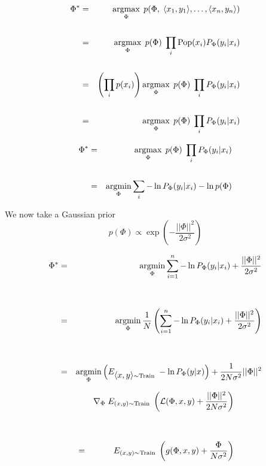 {\vfill
{\huge
\begin{eqnarray*}
\Phi^* & = & \operatorname*{argmax}_\Phi\;p(\Phi,\;{\mbox{$\langle x_1,y_1\rangle$}},\ldots,{\mbox{$\langle x_n,y_n\rangle$}}) \\
\\
 & = & \operatorname*{argmax}_\Phi \; p(\Phi)\;\prod_i \mathrm{Pop}(x_i)P_\Phi(y_i|x_i) \\
 \\
  & = & \left(\prod_i p(x_i)\right) \operatorname*{argmax}_\Phi \; p(\Phi)\;\prod_i  P_\Phi(y_i|x_i) \\
 \\
  & = & \operatorname*{argmax}_\Phi \; p(\Phi)\;\prod_i P_\Phi(y_i|x_i)
 \end{eqnarray*}
}


\begin{eqnarray*}
\Phi^*   & = & \operatorname*{argmax}_\Phi \; p(\Phi)\;\prod_i P_\Phi(y_i|x_i) \\
\\
& = & \operatorname*{argmin}_\Phi \sum_i - \ln P_\Phi(y_i|x_i) -\ln  p(\Phi)
\end{eqnarray*}

\vfill
We now take a Gaussian prior {\color{red} $$p(\Phi) \propto \exp\left(-\frac{||\Phi||^2}{2\sigma^2}\right)$$}


\begin{eqnarray*}
\Phi^* & = & \operatorname*{argmin}_\Phi \sum_{i = 1}^n - \ln P_\Phi(y_i|x_i) + \frac{||\Phi||^2}{2\sigma^2}  \\
\\
\\
& = & \operatorname*{argmin}_\Phi \frac{1}{N} \left(\sum_{i = 1}^n - \ln P_\Phi(y_i|x_i) + \frac{||\Phi||^2}{2\sigma^2}\right)  \\
\\
\\
& = & \operatorname*{argmin}_\Phi \left(E_{{\mbox{$\langle x,y\rangle$}}\sim \mathrm{Train}}\;-\ln P_\Phi(y|x)\right) + \frac{1}{2N\sigma^2} ||\Phi||^2
\end{eqnarray*}


\begin{eqnarray*}
  & & \nabla_\Phi \;E_{(x,y) \sim \mathrm{Train}}\;\left({\cal L}(\Phi,x,y) + \frac{||\Phi||^2}{2N\sigma^2}\right) \\
  \\
  \\
  & = & E_{(x,y) \sim \mathrm{Train}} \;\left(g(\Phi,x,y) + \frac{\Phi}{N\sigma^2}\right)
\end{eqnarray*}

}
